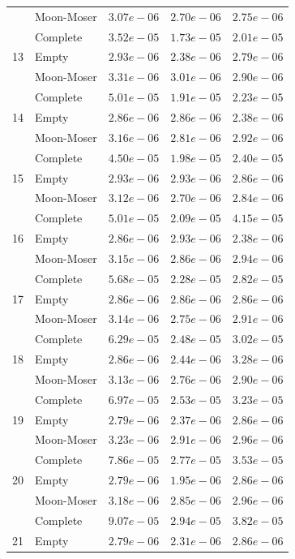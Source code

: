 \documentclass[12pt,a4paper]{article}
\begin{document}
\begin{longtable}{|l||l|l|l|l|}
  & Moon-Moser & $3.07e-06$ & $2.70e-06$ & $2.75e-06$ \\
  & Complete & $3.52e-05$ & $1.73e-05$ & $2.01e-05$ \\
  \hline
  13 & Empty & $2.93e-06$ & $2.38e-06$ & $2.79e-06$ \\
  & Moon-Moser & $3.31e-06$ & $3.01e-06$ & $2.90e-06$ \\
  & Complete & $5.01e-05$ & $1.91e-05$ & $2.23e-05$ \\
  \hline
  14 & Empty & $2.86e-06$ & $2.86e-06$ & $2.38e-06$ \\
  & Moon-Moser & $3.16e-06$ & $2.81e-06$ & $2.92e-06$ \\
  & Complete & $4.50e-05$ & $1.98e-05$ & $2.40e-05$ \\
  \hline
  15 & Empty & $2.93e-06$ & $2.93e-06$ & $2.86e-06$ \\
  & Moon-Moser & $3.12e-06$ & $2.70e-06$ & $2.84e-06$ \\
  & Complete & $5.01e-05$ & $2.09e-05$ & $4.15e-05$ \\
  \hline
  16 & Empty & $2.86e-06$ & $2.93e-06$ & $2.38e-06$ \\
  & Moon-Moser & $3.15e-06$ & $2.86e-06$ & $2.94e-06$ \\
  & Complete & $5.68e-05$ & $2.28e-05$ & $2.82e-05$ \\
  \hline
  17 & Empty & $2.86e-06$ & $2.86e-06$ & $2.86e-06$ \\
  & Moon-Moser & $3.14e-06$ & $2.75e-06$ & $2.91e-06$ \\
  & Complete & $6.29e-05$ & $2.48e-05$ & $3.02e-05$ \\
  \hline
  18 & Empty & $2.86e-06$ & $2.44e-06$ & $3.28e-06$ \\
  & Moon-Moser & $3.13e-06$ & $2.76e-06$ & $2.90e-06$ \\
  & Complete & $6.97e-05$ & $2.53e-05$ & $3.23e-05$ \\
  \hline
  19 & Empty & $2.79e-06$ & $2.37e-06$ & $2.86e-06$ \\
  & Moon-Moser & $3.23e-06$ & $2.91e-06$ & $2.96e-06$ \\
  & Complete & $7.86e-05$ & $2.77e-05$ & $3.53e-05$ \\
  \hline
  20 & Empty & $2.79e-06$ & $1.95e-06$ & $2.86e-06$ \\
  & Moon-Moser & $3.18e-06$ & $2.85e-06$ & $2.96e-06$ \\
  & Complete & $9.07e-05$ & $2.94e-05$ & $3.82e-05$ \\
  \hline
  21 & Empty & $2.79e-06$ & $2.31e-06$ & $2.86e-06$ \\

\end{longtable}
\end{document}
